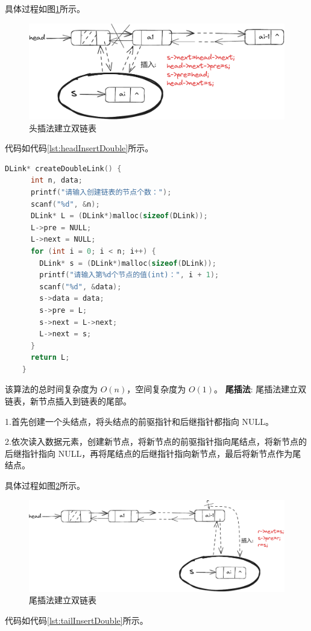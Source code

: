 \documentclass[lang=cn,newtx,10pt,scheme=chinese]{elegantbook}
\begin{document}
  具体过程如图\ref{fig:headInsertDouble}所示。
  \begin{figure}[h]
    \centering
    \includegraphics[width=1\textwidth]{./figure/pdf/cropped/headInsertDL.pdf}
    \caption{头插法建立双链表}
    \label{fig:headInsertDouble}
  \end{figure}
  代码如代码\ref{lst:headInsertDouble}所示。
  \begin{lstlisting}[language=C++, caption={头插法建立双链表示例代码}, label={lst:headInsertDouble}]
    DLink* createDoubleLink() {
      int n, data;
      printf("请输入创建链表的节点个数：");
      scanf("%d", &n);
      DLink* L = (DLink*)malloc(sizeof(DLink));
      L->pre = NULL;
      L->next = NULL;
      for (int i = 0; i < n; i++) {
        DLink* s = (DLink*)malloc(sizeof(DLink));
        printf("请输入第%d个节点的值(int)：", i + 1);
        scanf("%d", &data);
        s->data = data;
        s->pre = L;
        s->next = L->next;
        L->next = s;
      }
      return L;
    }
  \end{lstlisting}
  该算法的总时间复杂度为 $O(n)$，空间复杂度为 $O(1)$。
  \textbf{尾插法}:
  尾插法建立双链表，新节点插入到链表的尾部。

  1.首先创建一个头结点，将头结点的前驱指针和后继指针都指向 NULL。

  2.依次读入数据元素，创建新节点，将新节点的前驱指针指向尾结点，将新节点的后继指针指向 NULL，再将尾结点的后继指针指向新节点，最后将新节点作为尾结点。

  具体过程如图\ref{fig:tailInsertDouble}所示。
  \begin{figure}[h]
    \centering
    \includegraphics[width=1\textwidth]{./figure/pdf/cropped/tailInsertDL.pdf}
    \caption{尾插法建立双链表}
    \label{fig:tailInsertDouble}
  \end{figure}
  代码如代码\ref{lst:tailInsertDouble}所示。
\end{document}
